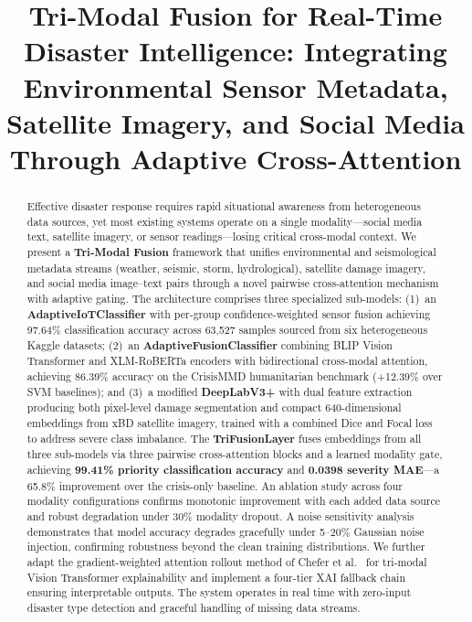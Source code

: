 \documentclass[journal]{IEEEtran}
\begin{document}
\title{Tri-Modal Fusion for Real-Time Disaster Intelligence: Integrating Environmental Sensor Metadata, Satellite Imagery, and Social Media Through Adaptive Cross-Attention}

\author{
}

\maketitle

\begin{abstract}
Effective disaster response requires rapid situational awareness from heterogeneous data sources, yet most existing systems operate on a single modality---social media text, satellite imagery, or sensor readings---losing critical cross-modal context. We present a \textbf{Tri-Modal Fusion} framework that unifies environmental and seismological metadata streams (weather, seismic, storm, hydrological), satellite damage imagery, and social media image--text pairs through a novel pairwise cross-attention mechanism with adaptive gating. The architecture comprises three specialized sub-models: (1)~an \textbf{AdaptiveIoTClassifier} with per-group confidence-weighted sensor fusion achieving 97.64\% classification accuracy across 63,527 samples sourced from six heterogeneous Kaggle datasets; (2)~an \textbf{AdaptiveFusionClassifier} combining BLIP Vision Transformer and XLM-RoBERTa encoders with bidirectional cross-modal attention, achieving 86.39\% accuracy on the CrisisMMD humanitarian benchmark (+12.39\% over SVM baselines); and (3)~a modified \textbf{DeepLabV3+} with dual feature extraction producing both pixel-level damage segmentation and compact 640-dimensional embeddings from xBD satellite imagery, trained with a combined Dice and Focal loss to address severe class imbalance. The \textbf{TriFusionLayer} fuses embeddings from all three sub-models via three pairwise cross-attention blocks and a learned modality gate, achieving \textbf{99.41\% priority classification accuracy} and \textbf{0.0398 severity MAE}---a 65.8\% improvement over the crisis-only baseline. An ablation study across four modality configurations confirms monotonic improvement with each added data source and robust degradation under 30\% modality dropout. A noise sensitivity analysis demonstrates that model accuracy degrades gracefully under 5--20\% Gaussian noise injection, confirming robustness beyond the clean training distributions. We further adapt the gradient-weighted attention rollout method of Chefer et al.~\cite{chefer2021transformer} for tri-modal Vision Transformer explainability and implement a four-tier XAI fallback chain ensuring interpretable outputs. The system operates in real time with zero-input disaster type detection and graceful handling of missing data streams.
\end{abstract}
\end{document}
